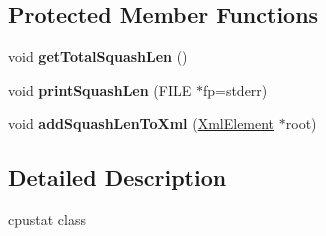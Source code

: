 \subsection*{Protected Member Functions}
\begin{DoxyCompactItemize}
\item 
\hypertarget{classProphetStat_1_1ProphetCpuStat_ad9e5aad82ee6015568bdfa6f3417458e}{
void {\bfseries getTotalSquashLen} ()}
\label{classProphetStat_1_1ProphetCpuStat_ad9e5aad82ee6015568bdfa6f3417458e}

\item 
\hypertarget{classProphetStat_1_1ProphetCpuStat_a515c271e82770fa4155b9aa30e6e6bf6}{
void {\bfseries printSquashLen} (FILE $\ast$fp=stderr)}
\label{classProphetStat_1_1ProphetCpuStat_a515c271e82770fa4155b9aa30e6e6bf6}

\item 
\hypertarget{classProphetStat_1_1ProphetCpuStat_ae07ae8a7fe5a86b18e4916673f5f8d0f}{
void {\bfseries addSquashLenToXml} (\hyperlink{classXmlElement}{XmlElement} $\ast$root)}
\label{classProphetStat_1_1ProphetCpuStat_ae07ae8a7fe5a86b18e4916673f5f8d0f}

\end{DoxyCompactItemize}


\subsection{Detailed Description}
cpustat class 

